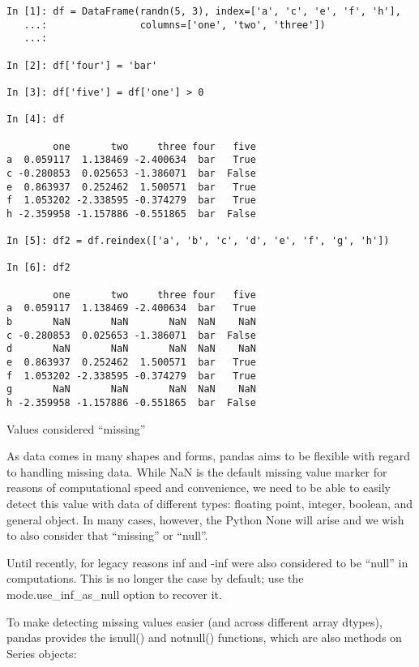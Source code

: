 \documentclass[11pt]{article} %
\begin{document}
\begin{verbatim}
In [1]: df = DataFrame(randn(5, 3), index=['a', 'c', 'e', 'f', 'h'],
   ...:                columns=['one', 'two', 'three'])
   ...: 

In [2]: df['four'] = 'bar'

In [3]: df['five'] = df['one'] > 0

In [4]: df

        one       two     three four   five
a  0.059117  1.138469 -2.400634  bar   True
c -0.280853  0.025653 -1.386071  bar  False
e  0.863937  0.252462  1.500571  bar   True
f  1.053202 -2.338595 -0.374279  bar   True
h -2.359958 -1.157886 -0.551865  bar  False

In [5]: df2 = df.reindex(['a', 'b', 'c', 'd', 'e', 'f', 'g', 'h'])

In [6]: df2

        one       two     three four   five
a  0.059117  1.138469 -2.400634  bar   True
b       NaN       NaN       NaN  NaN    NaN
c -0.280853  0.025653 -1.386071  bar  False
d       NaN       NaN       NaN  NaN    NaN
e  0.863937  0.252462  1.500571  bar   True
f  1.053202 -2.338595 -0.374279  bar   True
g       NaN       NaN       NaN  NaN    NaN
h -2.359958 -1.157886 -0.551865  bar  False
\end{verbatim}
\newpage
Values considered “missing”

As data comes in many shapes and forms, pandas aims to be flexible with regard to handling missing data. While NaN is the default missing value marker for reasons of computational speed and convenience, we need to be able to easily detect this value with data of different types: floating point, integer, boolean, and general object. In many cases, however, the Python None will arise and we wish to also consider that “missing” or “null”.

Until recently, for legacy reasons inf and -inf were also considered to be “null” in computations. This is no longer the case by default; use the mode.use\_inf\_as\_null option to recover it.

To make detecting missing values easier (and across different array dtypes), pandas provides the isnull() and notnull() functions, which are also methods on Series objects:
\end{document}
